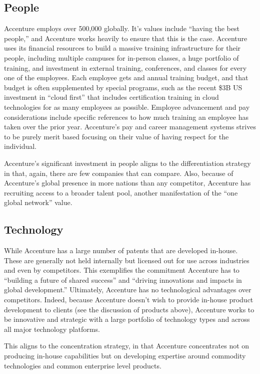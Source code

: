 \subsection{People}

Accenture employs over 500,000 globally. It's values include ``having the best people,'' and Accenture works heavily to ensure that this is the case. Accenture uses its financial resources to build a massive training infrastructure for their people, including multiple campuses for in-person classes, a huge portfolio of training, and investment in external training, conferences, and classes for every one of the employees. Each employee gets and annual training budget, and that budget is often supplemented by special programs, such as the recent \$3B US investment in ``cloud first'' that includes certification training in cloud technologies for as many employees as possible. Employee advancement and pay considerations include specific references to how much training an employee has taken over the prior year. Accenture's pay and career management systems strives to be purely merit based focusing on their value of having respect for the individual.

Accenture's significant investment in people aligns to the differentiation strategy in that, again, there are few companies that can compare. Also, because of Accenture's global presence in more nations than any competitor, Accenture has recruiting access to a broader talent pool, another manifestation of the ``one global network'' value.

\subsection{Technology}

While Accenture has a large number of patents that are developed in-house. These are generally not held internally but licensed out for use across industries and even by competitors. This exemplifies the commitment Accenture has to ``building a future of shared success'' and ``driving innovations and impacts in global development.'' Ultimately, Accenture has no technological advantages over competitors. Indeed, because Accenture doesn't wish to provide in-house product development to clients (see the discussion of products above), Accenture works to be innovative and strategic with a large portfolio of technology types and across all major technology platforms.

This aligns to the concentration strategy, in that Accenture concentrates not on producing in-house capabilities but on developing expertise around commodity technologies and common enterprise level products.

